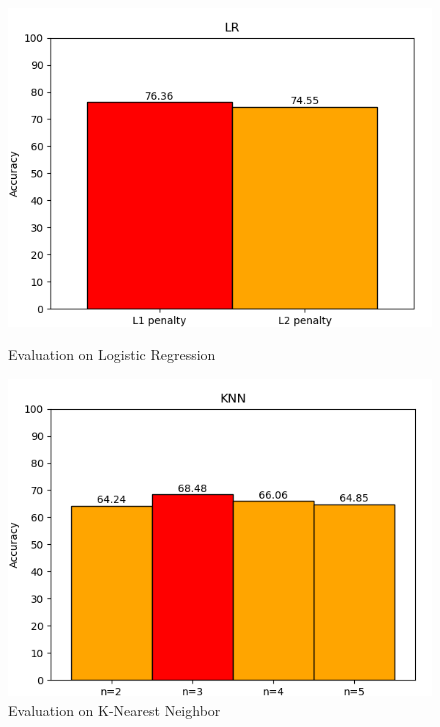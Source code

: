 \documentclass[a4paper,oneside]{article}
\begin{document}
\begin{figure}
	\centering
	\begin{minipage}[t]{8.6cm}
\includegraphics[width=1\linewidth]{LR}
  \centering
  \caption{Evaluation on Logistic Regression}
  \label{fig:LR}
	\end{minipage}
	\begin{minipage}[t]{8.6cm}
	\includegraphics[width=1\linewidth]{KNN}
  \centering
  \caption{Evaluation on K-Nearest Neighbor}
  \label{fig:KNN}
	\end{minipage}
\end{figure}
\end{document}
